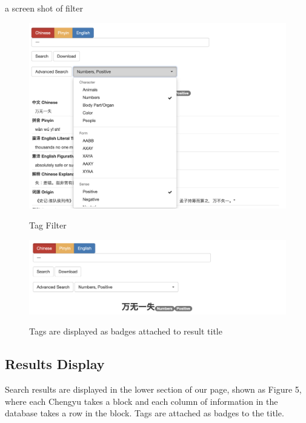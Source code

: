 \documentclass[11pt]{article} %
\begin{document}
\indent a screen shot of filter
\begin{figure}[htbp]
\begin{center}
\includegraphics[width=14cm]{filter.png}
\caption{Tag Filter}
\label{default}
\includegraphics[width=14cm]{badge1.png}
\caption{Tags are displayed as badges attached to result title}
\label{default}
\end{center}
\end{figure}

\subsection{Results Display}

\indent Search results are displayed in the lower section of our page, shown as Figure 5, where each Chengyu takes a block and each column of information in the database takes a row in the block. Tags are attached as badges to the title.
\end{document}
